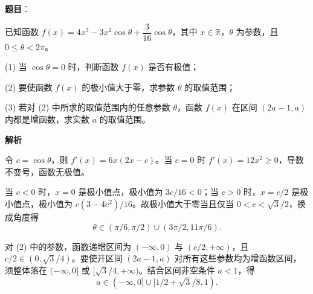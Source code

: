\begin{answer}

\textbf{题目}：

已知函数 \(f(x)=4x^3-3x^2\cos\theta+\dfrac3{16}\cos\theta\)，其中 \(x\in\mathbb R\)，\(\theta\) 为参数，且 \(0\leq\theta<2\pi\)。

(1) 当 \(\cos\theta=0\) 时，判断函数 \(f(x)\) 是否有极值；

(2) 要使函数 \(f(x)\) 的极小值大于零，求参数 \(\theta\) 的取值范围；

(3) 若对 (2) 中所求的取值范围内的任意参数 \(\theta\)，函数 \(f(x)\) 在区间 \((2a-1,a)\) 内都是增函数，求实数 \(a\) 的取值范围。

\textbf{解析}


令 \(c=\cos\theta\)，则 \(f'(x)=6x(2x-c)\)。当 \(c=0\) 时 \(f'(x)=12x^2\geq0\)，导数不变号，函数无极值。


当 \(c<0\) 时，\(x=0\) 是极小值点，极小值为 \(3c/16<0\)；当 \(c>0\) 时，\(x=c/2\) 是极小值点，极小值为 \(c(3-4c^2)/16\)。故极小值大于零当且仅当 \(0<c<\sqrt3/2\)，换成角度得
\nopagebreak[4]
\[
\theta\in(\pi/6,\pi/2)\cup(3\pi/2,11\pi/6).
\]


对 (2) 中的参数，函数递增区间为 \((-\infty,0)\) 与 \((c/2,+\infty)\)，且 \(c/2\in(0,\sqrt3/4)\)。要使开区间 \((2a-1,a)\) 对所有这些参数均为增函数区间，须整体落在 \((-\infty,0]\) 或 \([\sqrt3/4,+\infty)\)。结合区间非空条件 \(a<1\)，得
\nopagebreak[4]
\[
a\in(-\infty,0]\cup[1/2+\sqrt3/8,1).
\]



\gkanswer{答案（3）：\(a\in(-\infty,0]\cup[1/2+\sqrt3/8,1)\)。}

\end{answer}
